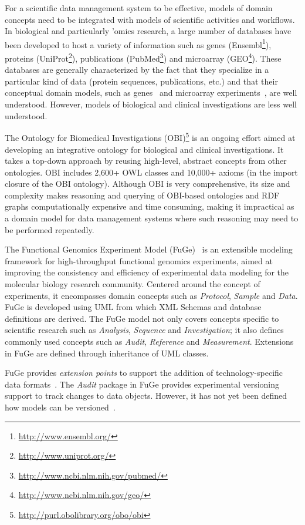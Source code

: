 \documentclass[preprint,12pt]{elsarticle}
\begin{document}
For a scientific data management system to be effective, models of domain concepts need to be integrated with models of scientific activities and workflows. In biological and particularly 'omics research, a large number of databases have been developed to host a variety of information such as genes (Ensembl\footnote{\url{http://www.ensembl.org/}}), proteins (UniProt\footnote{\url{http://www.uniprot.org/}}), publications (PubMed\footnote{\url{http://www.ncbi.nlm.nih.gov/pubmed/}}) and microarray (GEO\footnote{\url{http://www.ncbi.nlm.nih.gov/geo/}}). These databases are generally characterized by the fact that they specialize in a particular kind of data (protein sequences, publications, etc.) and that their conceptual domain models, such as genes~\cite{citeulike:212874} and microarray experiments~\cite{citeulike:151946}, are well understood. However, models of biological and clinical investigations are less well understood.

The Ontology for Biomedical Investigations (OBI)\footnote{\url{http://purl.obolibrary.org/obo/obi}} is an ongoing effort aimed at developing an integrative ontology for biological and clinical investigations. It takes a top-down approach by reusing high-level, abstract concepts from other ontologies. OBI includes 2,600+ OWL classes and 10,000+ axioms (in the import closure of the OBI ontology). Although OBI is very comprehensive, its size and complexity makes reasoning and querying of OBI-based ontologies and RDF graphs computationally expensive and time consuming, making it impractical as a domain model for data management systems where such reasoning may need to be performed repeatedly.

The Functional Genomics Experiment Model (FuGe)~\cite{citeulike:1756058} is an extensible modeling framework for high-throughput functional genomics experiments, aimed at improving the consistency and efficiency of experimental data modeling for the molecular biology research community. Centered around the concept of experiments, it encompasses domain concepts such as \emph{Protocol}, \emph{Sample} and \emph{Data}. FuGe is developed using UML from which XML Schemas and database definitions are derived. The FuGe model not only covers concepts specific to scientific research such as \emph{Analysis}, \emph{Sequence} and \emph{Investigation}; it also defines commonly used concepts such as \emph{Audit}, \emph{Reference} and \emph{Measurement}. Extensions in FuGe are defined through inheritance of UML classes.

FuGe provides \emph{extension points} to support the addition of technology-specific data formats~\cite{citeulike:4540763}. The \emph{Audit} package in FuGe provides experimental versioning support to track changes to data objects. However, it has not yet been defined how models can be versioned~\cite{citeulike:4540763}.
\end{document}

